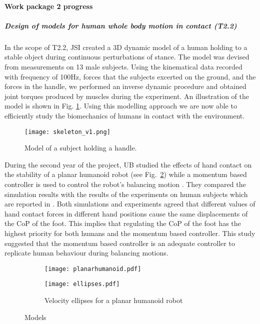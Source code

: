 \paragraph{Work package 2 progress}


\subparagraph{Design of models for human whole body motion in contact (T2.2)}
In the scope of T2.2, JSI created a 3D dynamic model of a human holding to a stable object during continuous perturbations of stance. The model was devised from measurements on 13 male subjects. Using the kinematical data recorded with frequency of 100Hz, forces that the subjects excerted on the ground, and the forces in the handle, we performed an inverse dynamic procedure and obtained joint torques produced by muscles during the experiment. An illustration of the model is shown in Fig. \ref{fig:skeleton}. Using this modelling approach we are now able to efficiently study the biomechanics of humans in contact with the environment.

\begin{figure}[!t]
	\begin{center}
		\texttt{[image: skeleton\_v1.png]}
		\caption{Model of a subject holding a handle.}
		\label{fig:skeleton}
	\end{center}
\end{figure}


During the second year of the project, UB studied the effects of hand contact
on the stability of a planar humanoid robot (see Fig.~\ref{planarhumanoid})
while a momentum based controller is used to control the robot's balancing
motion \cite{Azad2014}. They compared the simulation results with the
results of the experiments on human subjects which are reported in
\cite{Babic2014}. Both simulations and experiments agreed that different
values of hand contact forces in different hand positions cause the same
displacements of the CoP of the foot. This implies that regulating the CoP of
the foot has the highest priority for both humans and the momentum based
controller.  This study suggested that the momentum based controller is an
adequate controller to replicate human behaviour during balancing motions.

\begin{figure}[!t]
  \centering
	\begin{subfigure}[b]{0.45\textwidth}
	\centering
  	\texttt{[image: planarhumanoid.pdf]}
   \label{planarhumanoid}
	\end{subfigure}
	\begin{subfigure}[b]{0.45\textwidth}
	\centering
	\texttt{[image: ellipses.pdf]}
	\caption{Velocity ellipses for a planar humanoid robot}
	\label{ellipses}
	\end{subfigure}
	\caption{Models}
\end{figure}

